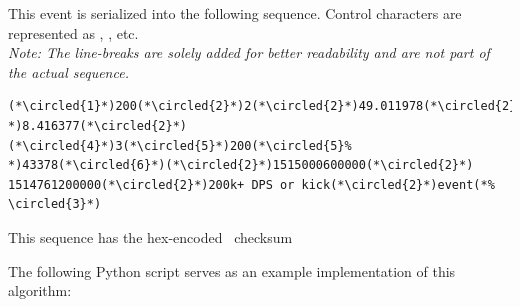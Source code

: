 \documentclass[parskip=full,11pt]{scrartcl}
\begin{document}
This event is serialized into the following sequence.
Control characters are represented as , , 
etc.\\
\textit{Note: The line-breaks are solely added for better readability and are
not part of the actual sequence.}

\begin{lstlisting}[language=norm,firstnumber=1]
(*\circled{1}*)200(*\circled{2}*)2(*\circled{2}*)49.011978(*\circled{2}%
*)8.416377(*\circled{2}*)(*\circled{4}*)3(*\circled{5}*)200(*\circled{5}%
*)43378(*\circled{6}*)(*\circled{2}*)1515000600000(*\circled{2}*)
1514761200000(*\circled{2}*)200k+ DPS or kick(*\circled{2}*)event(*%
\circled{3}*)
\end{lstlisting}

This sequence has the hex-encoded \hashAlg~checksum\
\

\par The following Python script serves as an example implementation of this
algorithm:

\end{document}

